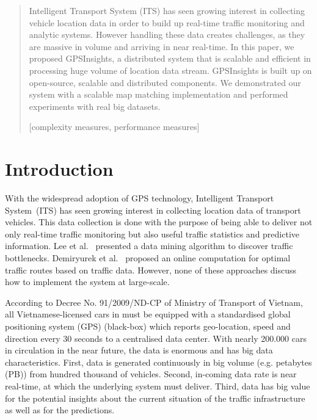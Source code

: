\documentclass{acm_proc_article-sp}
\begin{document}
\maketitle
\begin{abstract}
Intelligent Transport System (ITS) has seen growing interest in collecting vehicle location data in order to build up real-time traffic monitoring and analytic systems. However handling these data creates challenges, as they are massive in volume and arriving in near real-time. In this paper, we proposed GPSInsights, a distributed system that is scalable and efficient in processing huge volume of location data stream. GPSInsights is built up on open-source, scalable and distributed components. We demonstrated our system with a scalable map matching implementation and performed experiments with real big datasets. 

[complexity measures, performance measures]


\end{abstract}

\section{Introduction}


With the widespread adoption of GPS technology, Intelligent Transport System~(ITS) has seen growing interest in collecting location data of transport vehicles. This data collection is done with the purpose of being able to deliver not only real-time traffic monitoring but also useful traffic statistics and predictive information. Lee et al.~\cite{Lee2011} presented a data mining algorithm to discover traffic bottlenecks. Demiryurek et al.~\cite{Demiryurek2010} proposed an online computation for optimal traffic routes based on traffic data. However, none of these approaches discuss how to implement the system at large-scale.


According to Decree No. 91/2009/ND-CP of Ministry of Transport of Vietnam, all Vietnamese-licensed cars in must be equipped with a standardised global positioning system (GPS) (black-box) which reports geo-location, speed and direction every 30 seconds to a centralised data center. With nearly 200.000 cars in circulation in the near future, the data is enormous and has big data characteristics. First, data is generated continuously in big volume (e.g. petabytes (PB)) from hundred thousand of vehicles. Second, in-coming data rate is near real-time, at which the underlying system must deliver. Third, data has big value for the potential insights about the current situation of the traffic infrastructure as well as for the predictions. 
\end{document}
